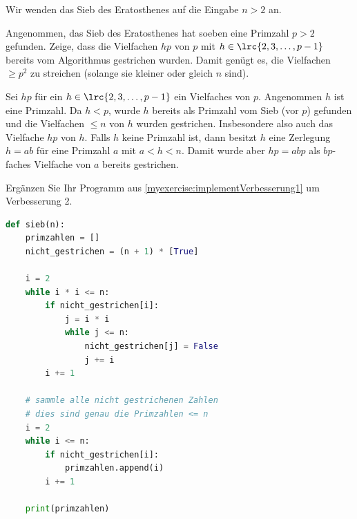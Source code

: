 	\begin{mychallenge}[Verbesserung 2]\label{myexercise:Verbesserung2}
		Wir wenden das Sieb des Eratosthenes auf die Eingabe $n>2$ an.

		Angenommen, das Sieb des Eratosthenes hat soeben eine Primzahl $p > 2$ gefunden. Zeige, dass die Vielfachen $hp$ von $p$ mit $h\in\lrc{2,3, \ldots , p-1}$ bereits vom Algorithmus gestrichen wurden. Damit genügt es, die Vielfachen $\geq p^2$ zu streichen (solange sie kleiner oder gleich $n$ sind).
		\begin{myanswer}
			Sei $hp$ für ein $h\in\lrc{2,3, \ldots , p-1}$ ein Vielfaches von $p$. Angenommen $h$ ist eine Primzahl. Da $h<p$, wurde $h$ bereits als Primzahl vom Sieb (vor $p$) gefunden und die Vielfachen $\leq n$ von $h$ wurden gestrichen. Insbesondere also auch das Vielfache $hp$ von $h$. Falls $h$ keine Primzahl ist, dann besitzt $h$ eine Zerlegung $h = ab$ für eine Primzahl $a$ mit $a<h<n$. Damit wurde aber $hp = abp$ als $bp$-faches Vielfache von $a$ bereits gestrichen.
		\end{myanswer}
	\end{mychallenge}


	\begin{mychallenge}\label{myexercise:implementVerbesserung2}
		Ergänzen Sie Ihr Programm aus \cref{myexercise:implementVerbesserung1} um Verbesserung 2.
		\begin{myanswer}
			\begin{lstlisting}[language=Python,caption=Verbesserung 2,numbers=none]
def sieb(n):
    primzahlen = []
    nicht_gestrichen = (n + 1) * [True]

    i = 2
    while i * i <= n:
        if nicht_gestrichen[i]:
            j = i * i
            while j <= n:
                nicht_gestrichen[j] = False
                j += i
        i += 1

    # sammle alle nicht gestrichenen Zahlen
    # dies sind genau die Primzahlen <= n
    i = 2
    while i <= n:
        if nicht_gestrichen[i]:
            primzahlen.append(i)
        i += 1

    print(primzahlen)
\end{lstlisting}
		\end{myanswer}
	\end{mychallenge}


